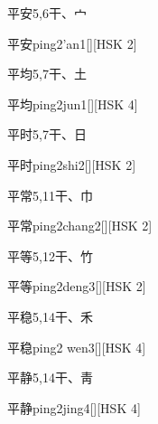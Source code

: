\begin{entry}{平安}{5,6}{⼲、⼧}
  \begin{phonetics}{平安}{ping2'an1}[][HSK 2]
  \end{phonetics}
\end{entry}

\begin{entry}{平均}{5,7}{⼲、⼟}
  \begin{phonetics}{平均}{ping2jun1}[][HSK 4]
  \end{phonetics}
\end{entry}

\begin{entry}{平时}{5,7}{⼲、⽇}
  \begin{phonetics}{平时}{ping2shi2}[][HSK 2]
  \end{phonetics}
\end{entry}

\begin{entry}{平常}{5,11}{⼲、⼱}
  \begin{phonetics}{平常}{ping2chang2}[][HSK 2]
  \end{phonetics}
\end{entry}

\begin{entry}{平等}{5,12}{⼲、⽵}
  \begin{phonetics}{平等}{ping2deng3}[][HSK 2]
  \end{phonetics}
\end{entry}

\begin{entry}{平稳}{5,14}{⼲、⽲}
  \begin{phonetics}{平稳}{ping2 wen3}[][HSK 4]
  \end{phonetics}
\end{entry}

\begin{entry}{平静}{5,14}{⼲、⾭}
  \begin{phonetics}{平静}{ping2jing4}[][HSK 4]
  \end{phonetics}
\end{entry}

